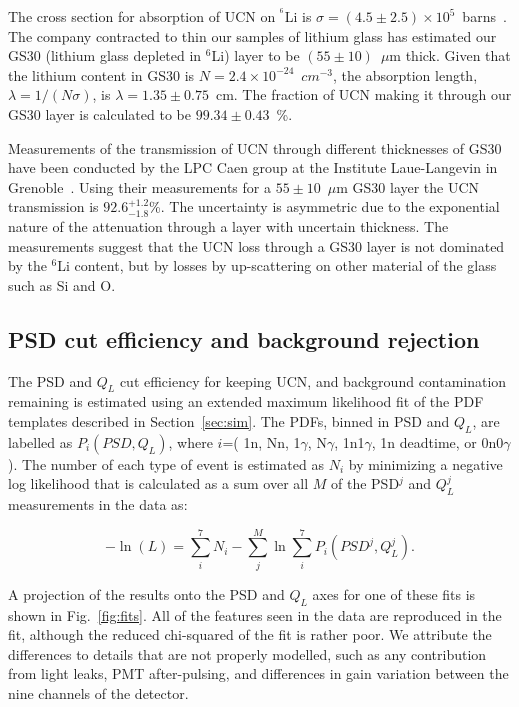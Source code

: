 \documentclass[twocolumn]{bmcart}
\begin{document}
The cross section for absorption of UCN on $^{^6}$Li is $\sigma =
(4.5\pm2.5)\times10^{5}$~barns~\cite{ban}.  The company contracted to
thin our samples of lithium glass has estimated our GS30 (lithium
glass depleted in $^6$Li) layer to be $(55\pm10)$~$\mu$m thick.  Given
that the lithium content in GS30 is $N = 2.4\times10^{-24}$~$cm^{-3}$,
the absorption length, $\lambda=1/(N\sigma)$, is
$\lambda=1.35\pm0.75$~cm.  The fraction of UCN making it through our
GS30 layer is calculated to be $99.34\pm0.43$~\%.

Measurements of the transmission of UCN through different thicknesses
of GS30 have been conducted by the LPC Caen group at the Institute
Laue-Langevin in Grenoble~\cite{Senoville}.  Using their measurements
for a $55\pm10$~$\mu$m GS30 layer the UCN transmission is
$92.6^{+1.2}_{-1.8}$\%. The uncertainty is asymmetric due to the
exponential nature of the attenuation through a layer with uncertain
thickness.  The measurements suggest that the UCN loss through a GS30
layer is not dominated by the $^{6}$Li content, but by losses by
up-scattering on other material of the glass such as Si and O.

\subsection{ PSD cut efficiency and background rejection}\label{sec:bgreject}

The PSD and $Q_L$ cut efficiency for keeping UCN, and background
contamination remaining is estimated using an extended maximum
likelihood fit of the PDF templates described in
Section~\ref{sec:sim}.  The PDFs, binned in PSD and $Q_L$, are
labelled as $P_{i}( PSD, Q_L )$, where $i$=( 1n, Nn, 1$\gamma$,
N$\gamma$, 1n1$\gamma$, 1n deadtime, or 0n0$\gamma$).  The number of
each type of event is estimated as $N_i$ by minimizing a negative log
likelihood that is calculated as a sum over all $M$ of the PSD$^j$ and
$Q_L^j$ measurements in the data as:

\begin{equation}
-\ln{(L)} = \sum_{i}^{7} N_i - \sum_{j}^{M} \ln{ \sum_{i}^{7} P_i( PSD^j, Q_L^j) }.
\end{equation}

A projection of the results onto the PSD and $Q_L$ axes for one of
these fits is shown in Fig.~\ref{fig:fits}.  All of the features seen
in the data are reproduced in the fit, although the reduced
chi-squared of the fit is rather poor.  We attribute the differences
to details that are not properly modelled, such as any contribution
from light leaks, PMT after-pulsing, and differences in gain variation
between the nine channels of the detector.
\end{document}
